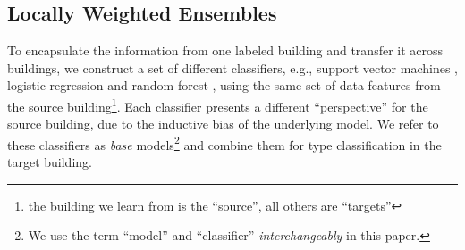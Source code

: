 

\subsection{Locally Weighted Ensembles}

To encapsulate the information from one labeled building and transfer it across
buildings, we construct a set of different classifiers, e.g., support vector machines \cite{suykens1999least}, logistic regression \cite{hosmer2004applied} and random forest \cite{liaw2002classification},
using the same set of data features from the source building\footnote{the
  building we learn from is the ``source'', all others are ``targets''}.  Each
classifier presents a different ``perspective'' for the source building, due to the
inductive bias of the underlying model.  We refer to these classifiers as {\it
  base} models\footnote{We use the term ``model'' and ``classifier'' {\it
    interchangeably} in this paper.} and combine them for type classification in the
target building.


